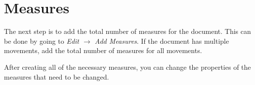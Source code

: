 \documentclass[]{memoir}
\begin{document}

\section{Measures}
\label{sec:measures}

The next step is to add the total number of measures for the document. This can be done by going to \textit{Edit $\rightarrow$ Add Measures}. If the document has multiple movements, add the total number of measures for all movements.

After creating all of the necessary measures, you can change the properties of the measures that need to be changed.

\end{document}
